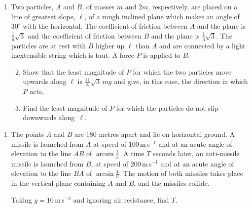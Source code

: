 \documentclass[a4, 11pt]{report}
\newlength{\qspace}
\newcounter{qnumber}
\newenvironment{question}%
 {\vspace{\qspace}
  \begin{enumerate}[\bfseries 1\quad][10]%
    \setcounter{enumi}{\value{qnumber}}%
    \item%
 }
{
  \end{enumerate}
  \filbreak
  \stepcounter{qnumber}
 }
\newenvironment{questionparts}[1][1]%
 {
  \begin{enumerate}[\bfseries (i)]%
    \setcounter{enumii}{#1}
    \addtocounter{enumii}{-1}
    \setlength{\itemsep}{5mm}
    \setlength{\parskip}{8pt}
 }
 {
  \end{enumerate}
 }
\begin{document}
	
\begin{question}
 Two particles, $A$ and $B$,  of masses $m$ and $2m$,
respectively, are placed on a line of greatest slope, $\ell$, of a 
rough inclined plane which makes
an angle of $30^{\circ}$ with the horizontal. The coefficient
of friction between $A$ and the plane is $\frac16\sqrt{3}$ 
and the coefficient of 
friction between $B$ and the plane is $\frac13 \sqrt{3}$. 
The particles  are at rest with
$B$ higher up $\ell$ than $A$ and are connected by a light inextensible string 
which is taut. A force $P$ is applied to $B$.

\begin{questionparts}
\item Show that the least magnitude of $P$ for which 
the two particles move upwards along $\ell$ is 
$\frac{11}8 \sqrt{3}\, mg$ and give, in this case,
 the direction in which $P$ acts.

\item Find the least magnitude of $P$ for which the particles
do not slip downwards along~$\ell$.
\end{questionparts}
	\end{question}
	
\begin{question}	
 The points $A$ and $B$ are $180$ metres apart and lie 
 on  horizontal ground. 
A missile is launched  from $A$ 
at  speed of $100\,$m\,s$^{-1}$ and at an
acute angle of elevation to the 
line $AB$ of $\arcsin \frac35$. A time $T$ seconds later,
an anti-missile missile  is launched from $B$, 
at speed of $200\,$m\,s$^{-1}$ 
and at an acute 
angle of elevation to the line $BA$ of $\arcsin \frac45$.    
The motion of both missiles
takes place in the vertical plane containing $A$ and $B$, and the 
missiles collide.

Taking $g =10\,$m\,s$^{-2}$ and ignoring air resistance,
find $T$.

\end{question}

\end{document}
